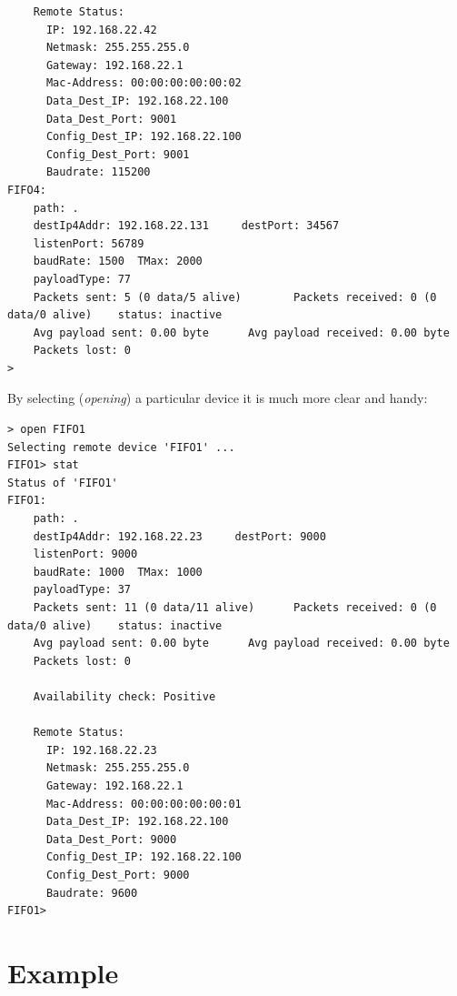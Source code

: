 \documentclass[a4paper]{book}%
\begin{document}
\begin{verbatim}
	Remote Status:
	  IP: 192.168.22.42
	  Netmask: 255.255.255.0
	  Gateway: 192.168.22.1
	  Mac-Address: 00:00:00:00:00:02
	  Data_Dest_IP: 192.168.22.100
	  Data_Dest_Port: 9001
	  Config_Dest_IP: 192.168.22.100
	  Config_Dest_Port: 9001
	  Baudrate: 115200
FIFO4:                                                                                                  
	path: .                                                                                         
	destIp4Addr: 192.168.22.131     destPort: 34567                                                 
	listenPort: 56789                                                                               
	baudRate: 1500  TMax: 2000                                                                      
	payloadType: 77                                                                                 
	Packets sent: 5 (0 data/5 alive)        Packets received: 0 (0 data/0 alive)    status: inactive
	Avg payload sent: 0.00 byte      Avg payload received: 0.00 byte                                
	Packets lost: 0
> 
\end{verbatim}

By selecting (\emph{opening}) a particular device it is much more clear and handy:
\begin{verbatim}
> open FIFO1
Selecting remote device 'FIFO1' ...
FIFO1> stat
Status of 'FIFO1'
FIFO1:                                                  
	path: .                               
	destIp4Addr: 192.168.22.23     destPort: 9000  
	listenPort: 9000                               
	baudRate: 1000  TMax: 1000                      
	payloadType: 37                                 
	Packets sent: 11 (0 data/11 alive)      Packets received: 0 (0 data/0 alive)    status: inactive
	Avg payload sent: 0.00 byte      Avg payload received: 0.00 byte                                
	Packets lost: 0                                                                                 

	Availability check: Positive

	Remote Status:
	  IP: 192.168.22.23
	  Netmask: 255.255.255.0
	  Gateway: 192.168.22.1
	  Mac-Address: 00:00:00:00:00:01
	  Data_Dest_IP: 192.168.22.100
	  Data_Dest_Port: 9000
	  Config_Dest_IP: 192.168.22.100
	  Config_Dest_Port: 9000
	  Baudrate: 9600
FIFO1>
\end{verbatim}

\section{Example}
\end{document}
